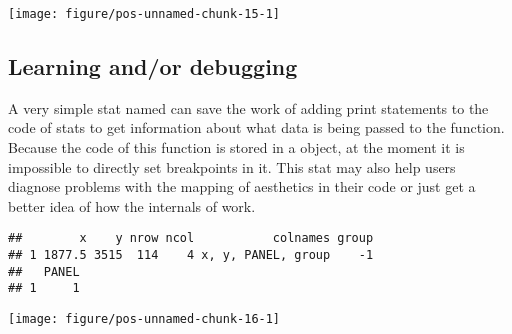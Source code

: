 \documentclass[paper=a4,10pt,div=17,headsepline,BCOR=12mm,twoside,open=right]{scrbook}\usepackage{knitr}
\begin{document}
\begin{knitrout}\footnotesize
{}\color{fgcolor}\begin{kframe}
\begin{alltt}
  \hlopt{+}
  \hlstd{(} \hlstd{=} \hlstd{)} \hlopt{+} \hlstd{(} \hlstd{=} \hlstd{)}
\end{alltt}
\end{kframe}

{\centering \texttt{[image: figure/pos-unnamed-chunk-15-1]} 

}



\end{knitrout}
\subsection{Learning and/or debugging}

A very simple stat named  can save the work of adding print statements to the code of stats to get information about what data is being passed to the  function. Because the code of this function is stored in a  object, at the moment it is impossible to directly set breakpoints in it. This stat may also help users diagnose problems with the mapping of aesthetics in their code or just get a better idea of how the internals of \ggplot work.

\begin{knitrout}\footnotesize
{}\color{fgcolor}\begin{kframe}
\begin{alltt}
  \hlopt{+} \hlstd{()} \hlopt{+}
  \hlstd{(} \hlstd{=} \hlstd{)}
\end{alltt}
\begin{verbatim}
##        x    y nrow ncol           colnames group
## 1 1877.5 3515  114    4 x, y, PANEL, group    -1
##   PANEL
## 1     1
\end{verbatim}
\end{kframe}

{\centering \texttt{[image: figure/pos-unnamed-chunk-16-1]} 

}



\end{knitrout}
\end{document}

